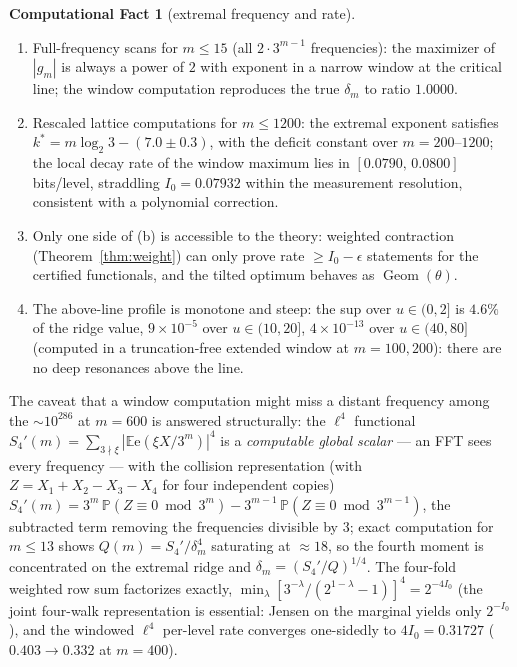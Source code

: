 \documentclass[11pt]{article}
\theoremstyle{definition}
\newtheorem{compfact}[theorem]{Computational Fact}
\DeclareMathOperator{\Geom}{Geom}
\newcommand{\E}{\mathbb{E}}
\newcommand{\Prob}{\mathbb{P}}
\newcommand{\e}{\mathrm{e}}
\begin{document}
\begin{compfact}[extremal frequency and rate]\label{cf:numerics}
\begin{enumerate}
\item[(a)] Full-frequency scans for $m\le 15$ (all $2\cdot 3^{m-1}$
  frequencies): the maximizer of $|g_m|$ is always a power of $2$ with
  exponent in a narrow window at the critical line; the window
  computation reproduces the true $\delta_m$ to ratio $1.0000$.
\item[(b)] Rescaled lattice computations for $m\le 1200$: the extremal
  exponent satisfies $k^*=m\log_2 3-(7.0\pm 0.3)$, with the deficit
  constant over $m=200$--$1200$; the local decay rate of the window
  maximum lies in $[0.0790,\,0.0800]$ bits/level, straddling
  $I_0=0.07932$ within the measurement resolution, consistent with a
  polynomial correction.
\item[(c)] Only one side of (b) is accessible to the theory: weighted
  contraction (Theorem~\ref{thm:weight}) can only prove rate $\ge I_0-\epsilon$
  statements for the certified functionals, and the tilted optimum
  behaves as $\Geom(\theta)$.
\item[(d)] The above-line profile is monotone and steep: the sup over
  $u\in(0,2]$ is $4.6\%$ of the ridge value, $9\times 10^{-5}$ over
  $u\in(10,20]$, $4\times 10^{-13}$ over $u\in(40,80]$ (computed in a
  truncation-free extended window at $m=100,200$): there are no deep
  resonances above the line.
\end{enumerate}
\end{compfact}

The caveat that a window computation might miss a distant frequency
among the $\sim 10^{286}$ at $m=600$ is answered structurally: the
$\ell^4$ functional $S_4'(m)=\sum_{3\nmid\xi}|\E\e(\xi X/3^m)|^4$ is a
\emph{computable global scalar} --- an FFT sees every frequency --- with
the collision representation (with $Z=X_1+X_2-X_3-X_4$ for four
independent copies)
$S_4'(m)=3^m\,\Prob(Z\equiv 0 \bmod 3^m)-3^{m-1}\,\Prob(Z\equiv 0 \bmod 3^{m-1})$,
the subtracted term removing the frequencies divisible by $3$; exact
computation
for $m\le 13$ shows $Q(m)=S_4'/\delta_m^4$ saturating at $\approx 18$, so
the fourth moment is concentrated on the extremal ridge and
$\delta_m=(S_4'/Q)^{1/4}$. The four-fold weighted row sum factorizes
exactly, $\min_{\lambda}[3^{-\lambda}/(2^{1-\lambda}-1)]^4=2^{-4I_0}$
(the joint four-walk representation is essential: Jensen on the marginal
yields only $2^{-I_0}$), and the windowed $\ell^4$ per-level rate
converges one-sidedly to $4I_0=0.31727$ ($0.403\to0.332$ at $m=400$).
\end{document}
